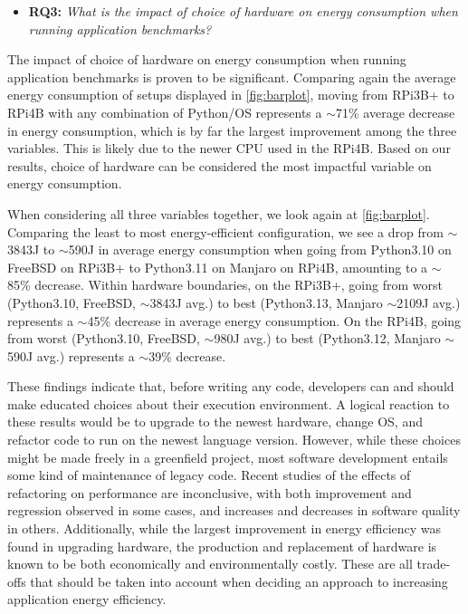 \begin{itemize}[label={}]
    \item \textbf{RQ3:}
    \textit{What is the impact of choice of hardware on energy consumption when running application benchmarks?}
\end{itemize}

The impact of choice of hardware on energy consumption when running application benchmarks is proven to be significant. Comparing again the average energy consumption of setups displayed in \autoref{fig:barplot}, moving from RPi3B+ to RPi4B with any combination of Python/OS represents a $\sim$71\% average decrease in energy consumption, which is by far the largest improvement among the three variables. This is likely due to the newer CPU used in the RPi4B. Based on our results, choice of hardware can be considered the most impactful variable on energy consumption.

When considering all three variables together, we look again at \autoref{fig:barplot}. Comparing the least to most energy-efficient configuration, we see a drop from $\sim$3843J to $\sim$590J in average energy consumption when going from Python3.10 on FreeBSD on RPi3B+ to Python3.11 on Manjaro on RPi4B, amounting to a $\sim$85\% decrease. Within hardware boundaries, on the RPi3B+, going from worst (Python3.10, FreeBSD, $\sim$3843J avg.) to best (Python3.13, Manjaro $\sim$2109J avg.) represents a $\sim$45\% decrease in average energy consumption. On the RPi4B, going from worst (Python3.10, FreeBSD, $\sim$980J avg.) to best (Python3.12, Manjaro $\sim$590J avg.) represents a $\sim$39\% decrease.

These findings indicate that, before writing any code, developers can and should make educated choices about their execution environment. A logical reaction to these results would be to upgrade to the newest hardware, change OS, and refactor code to run on the newest language version. However, while these choices might be made freely in a greenfield project, most software development entails some kind of maintenance of legacy code. Recent studies of the effects of refactoring on performance are inconclusive, with both improvement and regression observed in some cases\cite{traini2021software}, and increases and decreases in software quality in others\cite{almogahed2022recent}. Additionally, while the largest improvement in energy efficiency was found in upgrading hardware, the production and replacement of hardware is known to be both economically and environmentally costly\cite{gupta2021chasing}. These are all trade-offs that should be taken into account when deciding an approach to increasing application energy efficiency. 

